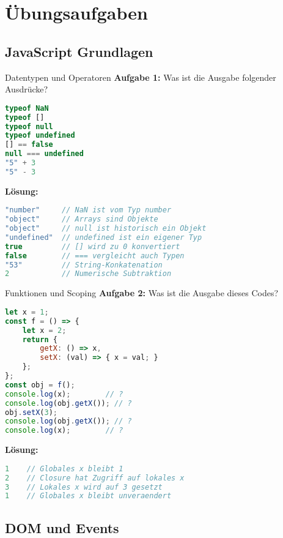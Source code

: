 \section{Übungsaufgaben}

\subsection{JavaScript Grundlagen}

\begin{example2}{Datentypen und Operatoren}
    \textbf{Aufgabe 1:} Was ist die Ausgabe folgender Ausdrücke?
    \begin{lstlisting}[language=JavaScript, style=basesmol]
typeof NaN
typeof []
typeof null
typeof undefined
[] == false
null === undefined
"5" + 3
"5" - 3
    \end{lstlisting}
    
    \textbf{Lösung:}
    \begin{lstlisting}[language=JavaScript, style=basesmol]
"number"     // NaN ist vom Typ number
"object"     // Arrays sind Objekte
"object"     // null ist historisch ein Objekt
"undefined"  // undefined ist ein eigener Typ
true         // [] wird zu 0 konvertiert
false        // === vergleicht auch Typen
"53"         // String-Konkatenation
2            // Numerische Subtraktion
    \end{lstlisting}
\end{example2}

\begin{example2}{Funktionen und Scoping}
    \textbf{Aufgabe 2:} Was ist die Ausgabe dieses Codes?
    \begin{lstlisting}[language=JavaScript, style=basesmol]
let x = 1;
const f = () => {
    let x = 2;
    return {
        getX: () => x,
        setX: (val) => { x = val; }
    };
};
const obj = f();
console.log(x);        // ?
console.log(obj.getX()); // ?
obj.setX(3);
console.log(obj.getX()); // ?
console.log(x);        // ?
    \end{lstlisting}
    
    \textbf{Lösung:}
    \begin{lstlisting}[language=JavaScript, style=basesmol]
1    // Globales x bleibt 1
2    // Closure hat Zugriff auf lokales x
3    // Lokales x wird auf 3 gesetzt
1    // Globales x bleibt unveraendert
    \end{lstlisting}
\end{example2}

\subsection{DOM und Events}


